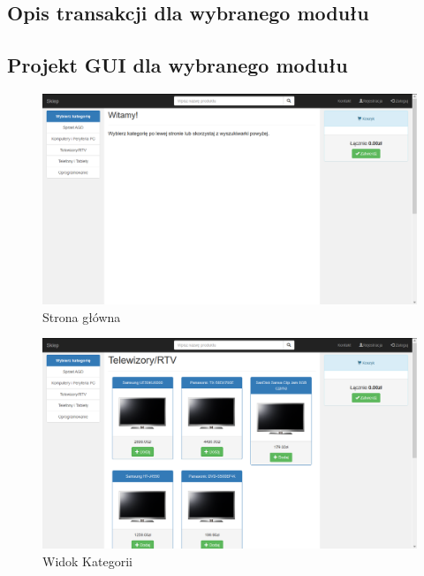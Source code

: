 \documentclass[10pt,a4paper]{article}
\begin{document}
   		\newpage
   		\subsection{Opis transakcji dla wybranego modułu}
	    \begin{landscape}
    	  \pagestyle{empty}
    	  
   		\subsection{Projekt GUI dla wybranego modułu}
	    \begin{figure}[H]
   	 	\caption{Strona główna}
	    \centering
   		\includegraphics[scale=0.6]{mainpage}
   		\end{figure}
   		
   		\newpage
	    \begin{figure}[H]
   		\caption{Widok Kategorii}
		\centering
   		\includegraphics[scale=0.6]{categories}
   		\end{figure}
   		

\end{landscape}
\end{document}
